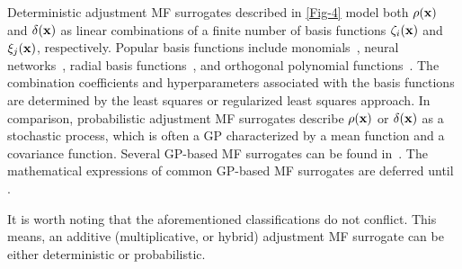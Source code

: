 \documentclass[journal ]{new-aiaa}
\begin{document}
Deterministic adjustment MF surrogates described in \cref{Fig-4} model both $\rho({\bf {x}})$ and $\delta({\bf{x}})$ as linear combinations of a finite number of basis functions $\zeta_i({\bf {x}})$ and $\xi_j({\bf x})$, respectively.
Popular basis functions include monomials~\citep{ZhangYiming2018,FernandezGodino2019}, neural networks~\citep{Kou2019}, radial basis functions~\citep{Tyan2015,LiuB2016,Durantin2017}, and orthogonal polynomial functions~\citep{Palar2016}. 
The combination coefficients and hyperparameters associated with the basis functions are determined by the least squares or regularized least squares approach. 
In comparison, probabilistic adjustment MF surrogates describe $\rho({\bf {x}})$ or $\delta({\bf{x}})$ as a stochastic process, which is often a GP characterized by a mean function and a covariance function.   
Several GP-based MF surrogates can be found in~\citet{Brevault2020}.
The mathematical expressions of common GP-based MF surrogates are deferred until .  

It is worth noting that the aforementioned classifications do not conflict.
This means, an additive (multiplicative, or hybrid) adjustment MF surrogate can be either deterministic or probabilistic.
\end{document}
